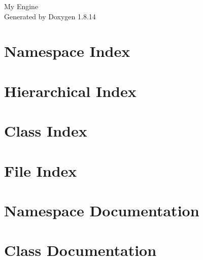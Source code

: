 \documentclass[twoside]{book}
\newcommand{\+}{\discretionary{\mbox{\scriptsize$\hookleftarrow$}}{}{}}
\newcommand{\clearemptydoublepage}{%
  \newpage{\pagestyle{empty}\cleardoublepage}%
}
\begin{document}
\hypersetup{pageanchor=false,
             bookmarksnumbered=true,
             pdfencoding=unicode
            }
\begin{titlepage}
\vspace*{7cm}
\begin{center}%
{\Large My Engine }\\
\vspace*{1cm}
{\large Generated by Doxygen 1.8.14}\\
\end{center}
\end{titlepage}
\clearemptydoublepage
{}
\tableofcontents
\clearemptydoublepage
{}
\hypersetup{pageanchor=true}

\chapter{Namespace Index}

\chapter{Hierarchical Index}

\chapter{Class Index}

\chapter{File Index}

\chapter{Namespace Documentation}

\chapter{Class Documentation}































\end{document}
